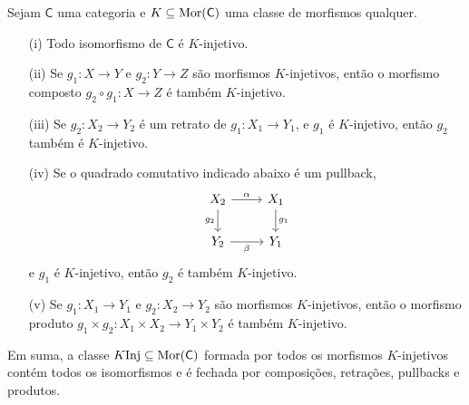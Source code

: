 \begin{prop}\label{prop:props_morfismos_inj}
  Sejam $\mathsf{C}$ uma categoria e $K \subseteq \mathrm{Mor}(\mathsf{C})$ uma classe de morfismos qualquer.
  \begin{enumerate}
    \item[(i)] Todo isomorfismo de $\mathsf{C}$ é $K$-injetivo.
    
    \item[(ii)] Se $g_1: X \to Y$ e $g_2: Y \to Z$ são morfismos $K$-injetivos, então o morfismo composto $g_2 \circ g_1: X \to Z$ é também $K$-injetivo.
    
    \item[(iii)] Se $g_2: X_2 \to Y_2$ é um retrato de $g_1: X_1 \to Y_1$, e $g_1$ é $K$-injetivo, então $g_2$ também é $K$-injetivo.

    \item[(iv)] Se o quadrado comutativo indicado abaixo é um pullback,
    \begin{displaymath}
      \begin{tikzcd}
        X_2
        \arrow[r, "\alpha"]
        \arrow[d, "g_2" swap]
        & X_1
        \arrow[d, "g_1"]
        \\ Y_2
        \arrow[r, "\beta" swap]
        & Y_1
      \end{tikzcd}
    \end{displaymath}
    e $g_1$ é $K$-injetivo, então $g_2$ é também $K$-injetivo.

    \item[(v)] Se $g_1: X_1 \to Y_1$ e $g_2: X_2 \to Y_2$ são morfismos $K$-injetivos, então o morfismo produto $g_1 \times g_2: X_1 \times X_2 \to Y_1 \times Y_2$ é também $K$-injetivo.
  \end{enumerate}
  Em suma, a classe $K\mathrm{Inj} \subseteq \mathrm{Mor}(\mathsf{C})$ formada por todos os morfismos $K$-injetivos contém todos os isomorfismos e é fechada por composições, retrações, pullbacks e produtos.
\end{prop}

